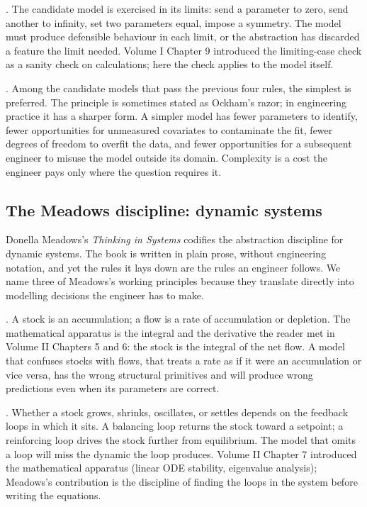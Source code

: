 . The candidate model is
exercised in its limits: send a parameter to zero, send another to
infinity, set two parameters equal, impose a symmetry. The model
must produce defensible behaviour in each limit, or the
abstraction has discarded a feature the limit needed. Volume I
Chapter 9 introduced the limiting-case check as a sanity check on
calculations; here the check applies to the model itself.

. Among the candidate models that pass the previous four
rules, the simplest is preferred. The principle is sometimes stated
as Ockham's razor; in engineering practice it has a sharper form.
A simpler model has fewer parameters to identify, fewer
opportunities for unmeasured covariates to contaminate the fit,
fewer degrees of freedom to overfit the data, and fewer
opportunities for a subsequent engineer to misuse the model
outside its domain. Complexity is a cost the engineer pays only
where the question requires it.

\subsection{The Meadows discipline: dynamic systems}

Donella Meadows's \emph{Thinking in Systems} \cite{gen:meadows2008}
codifies the abstraction discipline for dynamic systems. The book
is written in plain prose, without engineering notation, and yet
the rules it lays down are the rules an engineer follows. We name
three of Meadows's working principles because they translate
directly into modelling decisions the engineer has to make.

. A stock
is an accumulation; a flow is a rate of accumulation or
depletion. The mathematical apparatus is the integral and the
derivative the reader met in Volume II Chapters 5 and 6: the
stock is the integral of the net flow. A model that confuses
stocks with flows, that treats a rate as if it were an
accumulation or vice versa, has the wrong structural primitives
and will produce wrong predictions even when its parameters are
correct.

. Whether a stock grows,
shrinks, oscillates, or settles depends on the feedback loops in
which it sits. A balancing loop returns the stock toward a
setpoint; a reinforcing loop drives the stock further from
equilibrium. The model that omits a loop will miss the dynamic
the loop produces. Volume II Chapter 7 introduced the
mathematical apparatus (linear ODE stability, eigenvalue
analysis); Meadows's contribution is the discipline of finding
the loops in the system before writing the equations.

